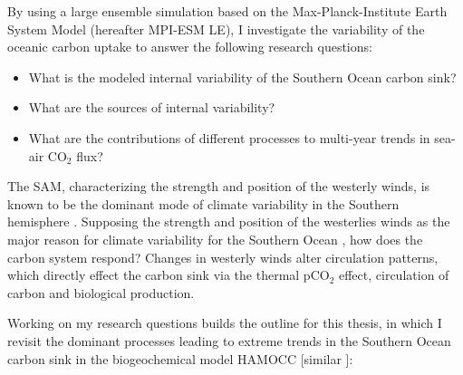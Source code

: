 By using a large ensemble simulation based on the Max-Planck-Institute Earth System Model (hereafter \acs{MPI-ESM LE}), I investigate the variability of the oceanic carbon uptake to answer the following research questions: 
\begin{itemize}
\item What is the modeled internal variability of the Southern Ocean carbon sink? 
\item What are the sources of internal variability?
\item What are the contributions of different processes to multi-year trends in sea-air CO$_2$ flux?
\end{itemize} 


 
 
The \ac{SAM}, characterizing the strength and position of the westerly winds, is known to be the dominant mode of climate variability in the Southern hemisphere \citep{Thompson2000,Thompson2011}. Supposing the strength and position of the westerlies winds as the major reason for climate variability for the Southern Ocean \citep{Thompson2000}, how does the carbon system respond? Changes in westerly winds alter circulation patterns, which directly effect the carbon sink via the thermal pCO$_2$ effect, circulation of carbon and biological production.\newline

Working on my research questions builds the outline for this thesis, in which I revisit the dominant processes leading to extreme trends in the Southern Ocean carbon sink in the biogeochemical model \acs{HAMOCC} [similar \cite{Lovenduski2007,Lovenduski2008}]:

